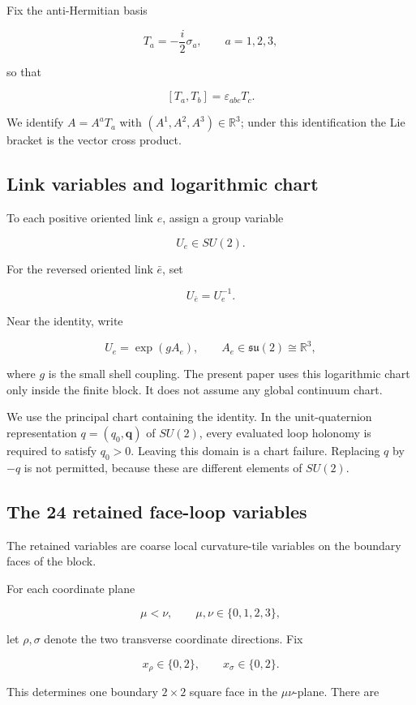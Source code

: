 \documentclass[10pt]{article}
\begin{document}
Fix the anti-Hermitian basis

\[
T_a=-\frac{i}{2}\sigma_a,\qquad a=1,2,3,
\]

so that

\[
[T_a,T_b]=\varepsilon_{abc}T_c.
\]

We identify \(A=A^aT_a\) with \((A^1,A^2,A^3)\in\mathbb R^3\); under this identification the Lie bracket is the vector cross product.

\subsection{Link variables and logarithmic chart}

To each positive oriented link \(e\), assign a group variable

\[
U_e\in SU(2).
\]

For the reversed oriented link \(\bar e\), set

\[
U_{\bar e}=U_e^{-1}.
\]

Near the identity, write

\[
U_e=\exp(gA_e),
\qquad
A_e\in\mathfrak{su}(2)\cong\mathbb R^3,
\]

where \(g\) is the small shell coupling.  The present paper uses this logarithmic chart only inside the finite block.  It does not assume any global continuum chart.

We use the principal chart containing the identity.  In the unit-quaternion representation \(q=(q_0,\mathbf q)\) of \(SU(2)\), every evaluated loop holonomy is required to satisfy \(q_0>0\).  Leaving this domain is a chart failure.  Replacing \(q\) by \(-q\) is not permitted, because these are different elements of \(SU(2)\).

\subsection{The 24 retained face-loop variables}

The retained variables are coarse local curvature-tile variables on the boundary faces of the block.

For each coordinate plane

\[
\mu<\nu,\qquad \mu,\nu\in\{0,1,2,3\},
\]

let \(\rho,\sigma\) denote the two transverse coordinate directions.  Fix

\[
x_\rho\in\{0,2\},
\qquad
x_\sigma\in\{0,2\}.
\]

This determines one boundary \(2\times2\) square face in the \(\mu\nu\)-plane.  There are
\end{document}
